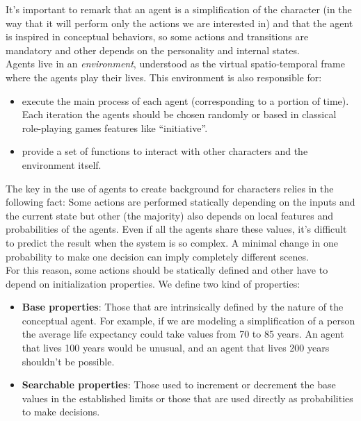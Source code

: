 \documentclass{sig-alternate}
\begin{document}
It's important to remark that an agent is a simplification of the character (in the way that it will perform only the actions we are interested in) and that the agent is inspired in conceptual behaviors, so some actions and transitions are mandatory and other depends on the personality and internal states.\\


Agents live in an {\em environment}, understood as the virtual spatio-temporal frame where the agents play their lives. This environment is also responsible for:
\begin{itemize}
\item execute the main process of each agent (corresponding to a portion of time). Each iteration the agents should be chosen randomly or based in classical role-playing games features like ``initiative''.
\item provide a set of functions to interact with other characters and the environment itself.
\end{itemize}



The key in the use of agents to create background for characters relies in the following fact: Some actions are performed statically depending on the inputs and the current state but other (the majority) also depends on local features and probabilities of the agents. Even if all the agents share these values, it's difficult to predict the result when the system is so complex. A minimal change in one probability to make one decision can imply completely different scenes.\\

For this reason, some actions should be statically defined and other have to depend on initialization properties. We define two kind of properties:

\begin{itemize}
\item \textbf{Base properties}: Those that are intrinsically defined by the nature of the conceptual agent. For example, if we are modeling a simplification of a person the average life expectancy could take values from 70 to 85 years. An agent that lives 100 years would be unusual, and an agent that lives 200 years shouldn't be possible.
\item \textbf{Searchable properties}: Those used to increment or decrement the base values in the established limits or those that are used directly as probabilities to make decisions.
\end{itemize}
\end{document}
